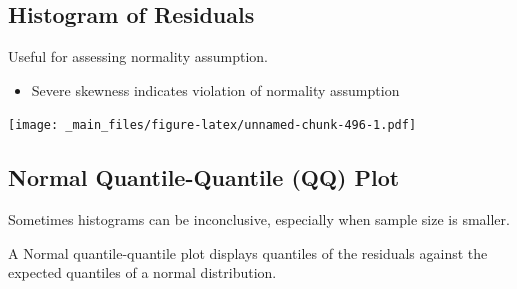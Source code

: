 \documentclass[]{book}
\newenvironment{Shaded}{\begin{snugshade}}{\end{snugshade}}
\newcommand{\KeywordTok}[1]{\textcolor[rgb]{0.13,0.29,0.53}{\textbf{#1}}}
\newcommand{\DataTypeTok}[1]{\textcolor[rgb]{0.13,0.29,0.53}{#1}}
\newcommand{\DecValTok}[1]{\textcolor[rgb]{0.00,0.00,0.81}{#1}}
\newcommand{\StringTok}[1]{\textcolor[rgb]{0.31,0.60,0.02}{#1}}
\newcommand{\OperatorTok}[1]{\textcolor[rgb]{0.81,0.36,0.00}{\textbf{#1}}}
\newcommand{\NormalTok}[1]{#1}
\providecommand{\tightlist}{%
  \setlength{\itemsep}{0pt}\setlength{\parskip}{0pt}}
\begin{document}
\subsection{Histogram of Residuals}\label{histogram-of-residuals}

Useful for assessing normality assumption.

\begin{itemize}
\tightlist
\item
  Severe skewness indicates violation of normality assumption
\end{itemize}

\begin{Shaded}
\end{Shaded}

\texttt{[image: \_main\_files/figure-latex/unnamed-chunk-496-1.pdf]}

\subsection{Normal Quantile-Quantile (QQ)
Plot}\label{normal-quantile-quantile-qq-plot}

Sometimes histograms can be inconclusive, especially when sample size is
smaller.

A Normal quantile-quantile plot displays quantiles of the residuals
against the expected quantiles of a normal distribution.
\end{document}
